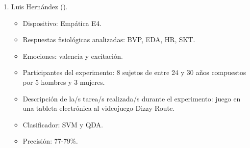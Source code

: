 \begin{enumerate}
    \item Luis Hernández (\citeyear{hernandez2016clasificacion}).
    \begin{itemize}
        \item Dispositivo: Empática E4.
        \item Respuestas fisiológicas analizadas: BVP, EDA, HR, SKT.
        \item Emociones: valencia y excitación.
        \item Participantes del experimento: 8 sujetos de entre 24 y 30 años compuestos por 5 hombres y 3 mujeres.
        \item Descripción de la/s tarea/s realizada/s durante el experimento: juego en una tableta electrónica al videojuego Dizzy Route.
        \item Clasificador: SVM y QDA.
        \item Precisión: 77-79\%.
    \end{itemize}

\end{enumerate}


